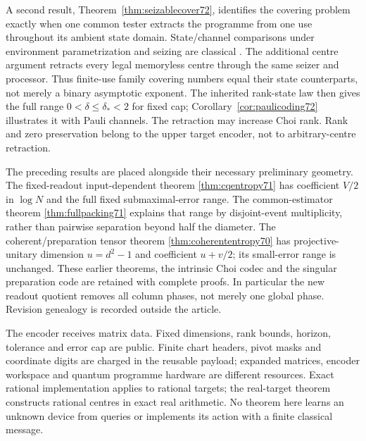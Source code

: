 A second result, Theorem~\ref{thm:seizablecover72}, identifies the
covering problem exactly when one common tester extracts the programme
from one use throughout its ambient state domain. State/channel
comparisons under environment parametrization and seizing are classical
\cite{DW72,WBHK72,WW72}. The additional centre argument retracts every
legal memoryless centre through the same seizer and processor. Thus
finite-use family covering numbers equal their state counterparts,
not merely a binary asymptotic exponent. The inherited rank-state law
then gives the full range $0<\delta\le\delta_*<2$ for fixed cap;
Corollary~\ref{cor:paulicoding72} illustrates it with Pauli channels.
The retraction may increase Choi rank. Rank and zero preservation
belong to the upper target encoder, not to arbitrary-centre retraction.

The preceding results are placed alongside their necessary preliminary
geometry. The fixed-readout input-dependent theorem
\ref{thm:cqentropy71} has coefficient $V/2$ in $\log N$ and the full
fixed submaximal-error range. The common-estimator theorem
\ref{thm:fullpacking71} explains that range by disjoint-event
multiplicity, rather than pairwise separation beyond half the diameter.
The coherent/preparation tensor theorem
\ref{thm:coherententropy70} has projective-unitary dimension $u=d^2-1$
and coefficient $u+v/2$; its small-error range is unchanged.
These earlier theorems, the intrinsic Choi codec and the singular
preparation code are retained with complete proofs. In particular the
new readout quotient removes all column phases, not merely one global
phase. Revision genealogy is recorded outside the article.

The encoder receives matrix data. Fixed dimensions, rank bounds,
horizon, tolerance and error cap are public. Finite chart headers,
pivot masks and coordinate digits are charged in the reusable payload;
expanded matrices, encoder workspace and quantum programme hardware
are different resources. Exact rational implementation applies to
rational targets; the real-target theorem constructs rational centres
in exact real arithmetic. No theorem here learns an unknown device
from queries or implements its action with a finite classical message.
